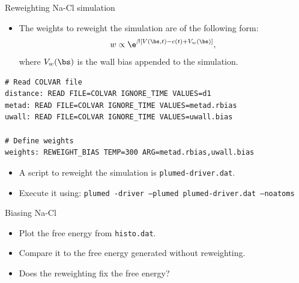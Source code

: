 \documentclass[10pt]{beamer}
\begin{document}
\begin{frame}[fragile]{Reweighting Na-Cl simulation}
\begin{itemize}
\setlength\itemsep{1em}
  \item The weights to reweight the simulation are of the following form:
  \begin{equation}
    w \propto \e^{\beta [V(\bs,t)-c(t)+V_w(\bs)]},
  \end{equation}
  where $V_w(\bs)$ is the wall bias appended to the simulation.
\end{itemize}

\begin{lstlisting}
# Read COLVAR file
distance: READ FILE=COLVAR IGNORE_TIME VALUES=d1
metad: READ FILE=COLVAR IGNORE_TIME VALUES=metad.rbias
uwall: READ FILE=COLVAR IGNORE_TIME VALUES=uwall.bias

# Define weights
weights: REWEIGHT_BIAS TEMP=300 ARG=metad.rbias,uwall.bias
\end{lstlisting}

\begin{itemize}
\setlength\itemsep{1em}
  \item A script to reweight the simulation is \texttt{plumed-driver.dat}.
  \item Execute it using: \texttt{plumed -driver --plumed plumed-driver.dat --noatoms}
\end{itemize}
\end{frame}

\begin{frame}[fragile]{Biasing Na-Cl}
\begin{itemize}
\setlength\itemsep{1em}
  \item Plot the free energy from \texttt{histo.dat}.

  \item Compare it to the free energy generated without reweighting.

  \item Does the reweighting fix the free energy?
\end{itemize}
\end{frame}
\end{document}
